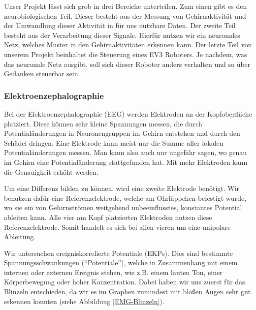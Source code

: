 \documentclass[11pt]{scrartcl}
\begin{document}
	Unser Projekt lässt sich grob in drei Bereiche unterteilen. Zum einen gibt es den neurobiologischen Teil. Dieser besteht aus der Messung von Gehirnaktivität und der Umwandlung dieser Aktivität in für uns nutzbare Daten. Der zweite Teil besteht aus der Verarbeitung dieser Signale. Hierfür nutzen wir ein neuronales Netz, welches Muster in den Gehirnaktivitäten erkennen kann. Der letzte Teil von unserem Projekt beinhaltet die Steuerung eines EV3 Roboters. Je nachdem, was das neuronale Netz ausgibt, soll sich dieser Roboter anders verhalten und so über Gedanken steuerbar sein.	

	\subsubsection{Elektroenzephalographie}

	Bei der Elektroenzephalographie (EEG) werden Elektroden an der Kopfoberfläche platziert. Diese können sehr kleine Spannungen messen, die durch Potentialänderungen in Neuronengruppen im Gehirn entstehen und durch den Schädel dringen. Eine Elektrode kann meist nur die Summe aller lokalen Potentialänderungen messen. Man kann also auch nur ungefähr sagen, wo genau im Gehirn eine Potentialänderung stattgefunden hat. Mit mehr Elektroden kann die Genauigkeit erhöht werden. \cite{wiki:EEG} \cite{Birbaumer2010}

	Um eine Differenz bilden zu können, wird eine zweite Elektrode benötigt. Wir benutzen dafür eine Referenzelektrode, welche am Ohrläppchen befestigt wurde, wo sie ein von Gehirnströmen weitgehend unbeeinflusstes, konstantes Potential ableiten kann. Alle vier am Kopf platzierten Elektroden nutzen diese Referenzelektrode. Somit handelt es sich bei allen vieren um eine unipolare Ableitung. \cite{Praktikum}

	Wir untersuchen ereigniskorrelierte Potentiale (EKPs). Dies sind bestimmte Spannungsschwankungen (\enquote{Potentiale}), welche in Zusammenhang mit einem internen oder externen Ereignis stehen, wie z.B. einem lauten Ton, einer Körperbewegung oder hoher Konzentration. \cite{Birbaumer2010} \cite{Praktikum}
Dabei haben wir uns zuerst für das Blinzeln entschieden, da wir es im Graphen zumindest mit bloßen Augen sehr gut erkennen konnten (siehe Abbildung \ref{EMG-Blinzeln}).
\end{document}
